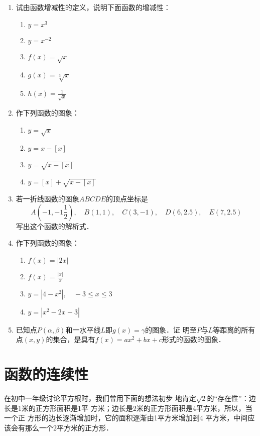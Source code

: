 \begin{ex}
\begin{enumerate}
    \item 试由函数增减性的定义，说明下面函数的增减性：
    \begin{multicols}{2}
\begin{enumerate}
    \item $y=x^3$
    \item $y=x^{-2}$
    \item $f(x)=\sqrt{x}$
    \item $g(x)=\sqrt[3]{x}$
    \item $h(x)=\frac{1}{\sqrt{x}}$
\end{enumerate}        
    \end{multicols}

    \item 作下列函数的图象：
    \begin{multicols}{2}
        \begin{enumerate}   
\item $y=\sqrt{x}$
\item $y=x-[x]$
\item $y=\sqrt{x-[x]}$
\item $y=[x]+\sqrt{x-[x]}  $
        \end{enumerate}        
    \end{multicols}
    \item 若一折线函数的图象$ABCDE$的顶点坐标是
\[A\left(-1,-1\frac{1}{2}\right),\quad B(1,1),\quad C(3,-1),\quad D(6,2.5),\quad E(7,2.5)\]    
写出这个函数的解析式．

\item 作下列函数的图象：
\begin{multicols}{2}
    \begin{enumerate}  
\item $f(x)=|2x|$
\item $f(x)=\frac{|x|}{x}$
\item $y=|4-x^2|,\quad -3\le x\le 3$
\item $y=|x^2-2x-3|$
\end{enumerate}        
\end{multicols}
\item 已知点$P(\alpha,\beta)$和一水平线$L$即$g(x)=\gamma$的图象．证
明至$P$与$L$等距离的所有点$(x,y)$的集合，是具有$f(x)=
ax^2+bx+c$形式的函数的图象．
\end{enumerate}
\end{ex}

\section{函数的连续性}
在初中一年级讨论平方根时，我们曾用下面的想法初步
地肯定$\sqrt{2}$的“存在性”：边长是1米的正方形面积是1平
方米；边长是2米的正方形面积是4平方米，所以，当一个正
方形的边长逐渐增加时，它的面积逐渐由1平方米增加到4
平方米，中间应该会有那么一个2平方米的正方形．

